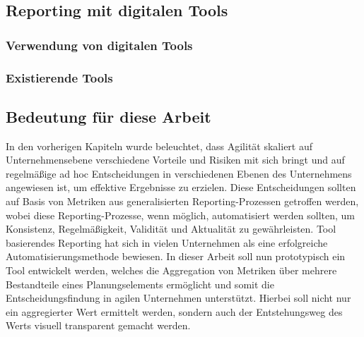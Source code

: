 \subsection{Reporting mit digitalen Tools}
\subsubsection{Verwendung von digitalen Tools}
\cite{guidelinesForPortfoliomanagement}

\subsubsection{Existierende Tools}


\subsection{Bedeutung für diese Arbeit}
In den vorherigen Kapiteln wurde beleuchtet, dass Agilität skaliert auf Unternehmensebene verschiedene Vorteile und  Risiken mit sich bringt und auf regelmäßige ad hoc Entscheidungen in verschiedenen Ebenen des Unternehmens angewiesen ist, um effektive Ergebnisse zu erzielen. Diese Entscheidungen sollten auf Basis von Metriken aus generalisierten Reporting-Prozessen getroffen werden, wobei diese Reporting-Prozesse, wenn möglich, automatisiert werden sollten, um Konsistenz, Regelmäßigkeit, Validität und Aktualität zu gewährleisten. Tool basierendes Reporting hat sich in vielen Unternehmen als eine erfolgreiche Automatisierungsmethode bewiesen.
In dieser Arbeit soll nun prototypisch ein Tool entwickelt werden, welches die Aggregation von Metriken über mehrere Bestandteile eines Planungselements ermöglicht und somit die Entscheidungsfindung in agilen Unternehmen unterstützt. Hierbei soll nicht nur ein aggregierter Wert ermittelt werden, sondern auch der Entstehungsweg des Werts visuell transparent gemacht werden.
